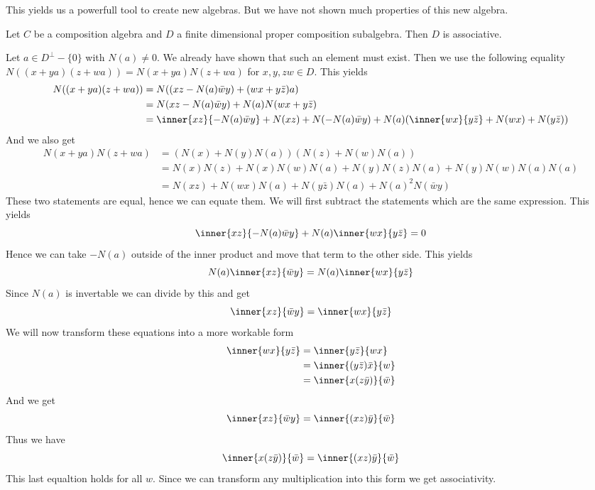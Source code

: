 \documentclass[../Thesis.tex]{subfiles}
\begin{document}
This yields us a powerfull tool to create new algebras. But we have not shown much properties of this new algebra. 
\begin{prop}
Let $C$ be a composition algebra and $D$ a finite dimensional proper composition subalgebra. Then $D$ is associative.
\end{prop}
\begin{myproof}
Let $ a \in D^\perp - \{0\}$ with $N(a) \neq 0$. We already have shown that such an element must exist. Then we use the following equality $N((x + ya)(z + wa)) = N(x + ya)N(z + wa)$ for $x,y ,z w \in D$. This yields
\begin{align*}
N((x + ya)(z + wa)) &= N((xz - N(a)\bar{w}y) + (wx + y\bar{z})a)\\
&=N(xz - N(a) \bar{w}y) + N(a) N(wx + y\bar{z}) \\
&=\inner{xz}{-N(a)\bar{w}y} + N(xz) + N(-N(a) \bar{w}y) + N(a) (\inner{wx}{y\bar{z}} + N(wx) + N(y \bar{z}))
\end{align*}
And we also get
\begin{align*}
N(x + ya)N(z + wa) &= (N(x) + N(y)N(a))(N(z) + N(w)N(a)) \\
&= N(x)N(z) + N(x)N(w) N(a) + N(y)N(z)N(a) + N(y)N(w)N(a)N(a)\\
&= N(xz) + N(wx)N(a) + N(y\bar{z})N(a) + N(a)^2N(\bar{w}y)
\end{align*}
These two statements are equal, hence we can equate them. We will first subtract the statements which are the same expression. This yields
\begin{equation}
\inner{xz}{-N(a)\bar{w}y} + N(a) \inner{wx}{y\bar{z}} = 0
\end{equation}
Hence we can take $-N(a)$ outside of the inner product and move that term to the other side. This yields
\begin{equation}
N(a)\inner{xz}{\bar{w}y} = N(a) \inner{wx}{y\bar{z}}
\end{equation}
Since $N(a)$ is invertable we can divide by this and get
\begin{equation}
\inner{xz}{\bar{w}y} = \inner{wx}{y\bar{z}}
\end{equation}
We will now transform these equations into a more workable form
\begin{align*}
\inner{wx}{y\bar{z}} &= \inner{y\bar{z}}{ wx} \\
&= \inner{(y \bar{z})\bar{x}}{w}\\
&= \inner{x(z \bar{y})}{ \bar{w}}
\end{align*}
And we get
\begin{equation*}
\inner{xz}{\bar{w}y} = \inner{(xz)\bar{y}}{\bar{w}}
\end{equation*}
Thus we have
\begin{equation}
\inner{x(z\bar{y})}{\bar{w}} = \inner{(xz)\bar{y}}{\bar{w}}
\end{equation}
This last equaltion holds for all $w$. Since we can transform any multiplication into this form we get associativity.
\end{myproof}
\end{document}
